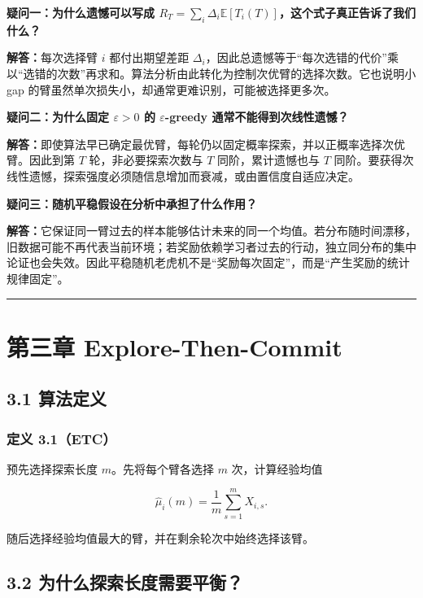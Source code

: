 \documentclass[
  11pt,
  a4paper,
]{ctexart}
\begin{document}
\textbf{疑问一：为什么遗憾可以写成 \(R_T=\sum_i\Delta_i\mathbb E[T_i(T)]\)，这个式子真正告诉了我们什么？}

\textbf{解答：}每次选择臂 \(i\) 都付出期望差距 \(\Delta_i\)，因此总遗憾等于“每次选错的代价”乘以“选错的次数”再求和。算法分析由此转化为控制次优臂的选择次数。它也说明小 gap 的臂虽然单次损失小，却通常更难识别，可能被选择更多次。

\textbf{疑问二：为什么固定 \(\varepsilon>0\) 的 \(\varepsilon\)-greedy 通常不能得到次线性遗憾？}

\textbf{解答：}即使算法早已确定最优臂，每轮仍以固定概率探索，并以正概率选择次优臂。因此到第 \(T\) 轮，非必要探索次数与 \(T\) 同阶，累计遗憾也与 \(T\) 同阶。要获得次线性遗憾，探索强度必须随信息增加而衰减，或由置信度自适应决定。

\textbf{疑问三：随机平稳假设在分析中承担了什么作用？}

\textbf{解答：}它保证同一臂过去的样本能够估计未来的同一个均值。若分布随时间漂移，旧数据可能不再代表当前环境；若奖励依赖学习者过去的行动，独立同分布的集中论证也会失效。因此平稳随机老虎机不是“奖励每次固定”，而是“产生奖励的统计规律固定”。

\begin{center}\rule{0.5\linewidth}{0.5pt}\end{center}

\section{第三章
Explore-Then-Commit}\label{ux7b2cux4e09ux7ae0-explore-then-commit}

\subsection{3.1 算法定义}\label{ux7b97ux6cd5ux5b9aux4e49}

\subsubsection{定义 3.1（ETC）}\label{ux5b9aux4e49-3.1etc}

预先选择探索长度 \(m\)。先将每个臂各选择 \(m\) 次，计算经验均值

\[
\widehat\mu_i(m)=\frac1m\sum_{s=1}^mX_{i,s}.
\]

随后选择经验均值最大的臂，并在剩余轮次中始终选择该臂。

\subsection{3.2
为什么探索长度需要平衡？}\label{ux4e3aux4ec0ux4e48ux63a2ux7d22ux957fux5ea6ux9700ux8981ux5e73ux8861}
\end{document}
